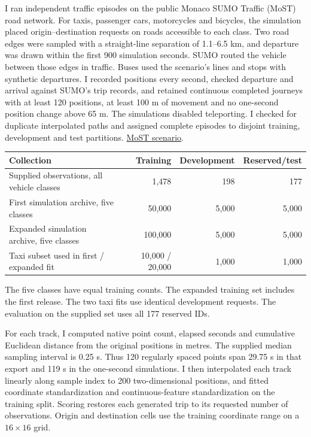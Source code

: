 \documentclass[11pt,a4paper]{article}
\newcommand{\subh}[1]{\par\vspace{4pt}{\large\sffamily\bfseries\color{ink}#1\par}}
\begin{document}
\subh{New SUMO journeys}
I ran independent traffic episodes on the public Monaco SUMO Traffic (MoST) road network. For taxis, passenger cars, motorcycles and bicycles, the simulation placed origin--destination requests on roads accessible to each class. Two road edges were sampled with a straight-line separation of 1.1--6.5 km, and departure was drawn within the first 900 simulation seconds. SUMO routed the vehicle between those edges in traffic. Buses used the scenario's lines and stops with synthetic departures. I recorded positions every second, checked departure and arrival against SUMO's trip records, and retained continuous completed journeys with at least 120 positions, at least 100 m of movement and no one-second position change above 65 m. The simulations disabled teleporting. I checked for duplicate interpolated paths and assigned complete episodes to disjoint training, development and test partitions. \href{https://github.com/lcodeca/MoSTScenario}{MoST scenario}.

\begin{center}\small
\begin{tabular}{@{}lrrr@{}}\toprule
Collection & Training & Development & Reserved/test\\\midrule
Supplied observations, all vehicle classes & 1,478 & 198 & 177\\
First simulation archive, five classes & 50,000 & 5,000 & 5,000\\
Expanded simulation archive, five classes & 100,000 & 5,000 & 5,000\\
Taxi subset used in first / expanded fit & 10,000 / 20,000 & 1,000 & 1,000\\\bottomrule
\end{tabular}\end{center}
The five classes have equal training counts. The expanded training set includes the first release. The two taxi fits use identical development requests. The evaluation on the supplied set uses all 177 reserved IDs.

\subh{Common model inputs}
For each track, I computed native point count, elapsed seconds and cumulative Euclidean distance from the original positions in metres. The supplied median sampling interval is 0.25 s. Thus 120 regularly spaced points span 29.75 s in that export and 119 s in the one-second simulations. I then interpolated each track linearly along sample index to 200 two-dimensional positions, and fitted coordinate standardization and continuous-feature standardization on the training split. Scoring restores each generated trip to its requested number of observations. Origin and destination cells use the training coordinate range on a $16\times16$ grid.
\end{document}
